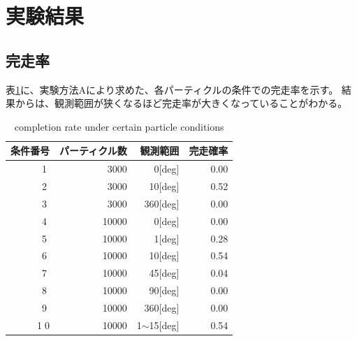 \documentclass{jarticle}
\begin{document}
\section{実験結果}%

\subsection{完走率}

表\ref{table:完走率}に、実験方法Aにより求めた、各パーティクルの条件での完走率を示す。
結果からは、観測範囲が狭くなるほど完走率が大きくなっていることがわかる。

\begin{table}[htbp]
  \caption{completion rate under certain particle conditions}
  \label{table:完走率}
  \begin{tabular}{|r|r|r|r|} \hline
  \small{条件番号} & \small{パーティクル数} & \small{観測範囲}  & \small{完走確率} \\ \hline \hline
  \small{\textcircled{\scriptsize 1}}  & \small{3000}  & \small{0[deg]}         & \small{0.00} \\ \hline
  \small{\textcircled{\scriptsize 2}}  & \small{3000}  & \small{10[deg]}        & \small{0.52} \\ \hline
  \small{\textcircled{\scriptsize 3}}  & \small{3000}  & \small{360[deg]}       & \small{0.00} \\ \hline
  \small{\textcircled{\scriptsize 4}}  & \small{10000} & \small{0[deg]}         & \small{0.00} \\ \hline
  \small{\textcircled{\scriptsize 5}}  & \small{10000} & \small{1[deg]}         & \small{0.28} \\ \hline
  \small{\textcircled{\scriptsize 6}}  & \small{10000} & \small{10[deg]}        & \small{0.54} \\ \hline
  \small{\textcircled{\scriptsize 7}}  & \small{10000} & \small{45[deg]}        & \small{0.04} \\ \hline
  \small{\textcircled{\scriptsize 8}}  & \small{10000} & \small{90[deg]}        & \small{0.00} \\ \hline
  \small{\textcircled{\scriptsize 9}}  & \small{10000} & \small{360[deg]}       & \small{0.00} \\ \hline
  \small{\textcircled{\scriptsize 10}} & \small{10000} & \small{1$\sim$15[deg]} & \small{0.54} \\ \hline
  \end{tabular}
\end{table}
\end{document}
